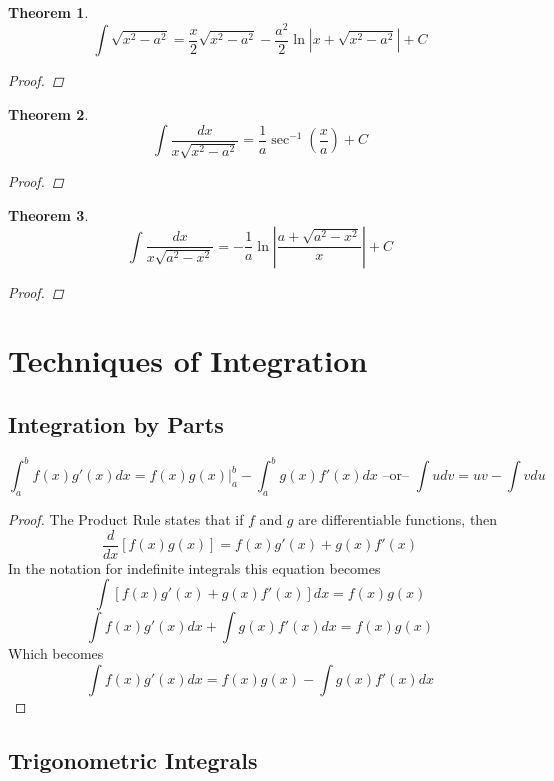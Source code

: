 \documentclass[10pt]{report}
\newtheorem{thm3}{Theorem}[subsection]
\begin{document}
\begin{thm3}
$$\int \sqrt{x^2-a^2}=\frac{x}{2}\sqrt{x^2-a^2}-\frac{a^2}{2}\ln|x+\sqrt{x^2-a^2}|+C$$
\begin{proof}

\end{proof}
\end{thm3}
\begin{thm3}
$$\int \frac{dx}{x\sqrt{x^2-a^2}}=\frac{1}{a}\sec^{-1}\left( \frac{x}{a}\right)+C$$
\begin{proof}

\end{proof}
\end{thm3}
\begin{thm3}
$$\int \frac{dx}{x\sqrt{a^2-x^2}}=-\frac{1}{a}\ln\left| \frac{a+\sqrt{a^2-x^2}}{x} \right|+C$$
\begin{proof}

\end{proof}
\end{thm3}

\section{Techniques of Integration}
\subsection{Integration by Parts}
$$\int_a^bf(x)g'(x)dx = f(x)g(x)|_a^b - \int_a^bg(x)f'(x)dx\text{  --or--  } \int udv = uv - \int vdu$$
\begin{proof}
The Product Rule states that if $f$ and $g$ are differentiable functions, then
$$\frac{d}{dx}[f(x)g(x)]=f(x)g'(x) + g(x)f'(x)$$
In the notation for indefinite integrals this equation becomes
$$\int [f(x)g'(x)+g(x)f'(x)]dx = f(x)g(x)$$
$$\int f(x)g'(x)dx+\int g(x)f'(x)dx = f(x)g(x)$$
Which becomes
$$\int f(x)g'(x)dx = f(x)g(x)-\int g(x)f'(x)dx$$
\end{proof}
\subsection{Trigonometric Integrals}
\end{document}

